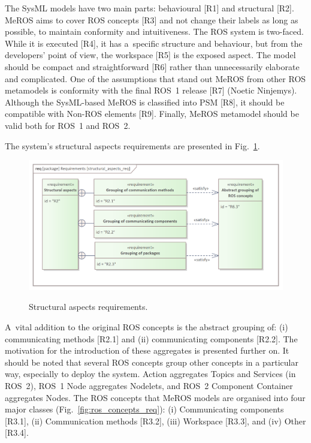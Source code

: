 The SysML models have two main parts: behavioural [R1] and structural [R2]. MeROS aims to cover ROS concepts [R3] and not change their labels as long as possible, to maintain conformity and intuitiveness. The ROS system is two-faced. While it is executed [R4], it has a~specific structure and behaviour, but from the developers' point of view, the workspace [R5] is the exposed aspect. The model should be compact and straightforward [R6] rather than unnecessarily elaborate and complicated. One of the assumptions that stand out MeROS from other ROS metamodels is conformity with the final ROS~1 release [R7] (Noetic Ninjemys). Although the SysML-based MeROS is classified into PSM [R8], it should be compatible with Non-ROS elements [R9]. Finally, MeROS metamodel should be valid both for ROS~1 and ROS~2.

The system's structural aspects requirements are presented in Fig.~\ref{fig:structural_aspects_req}.

\begin{figure}[H]
	\centering
	\begin{center}
	{\includegraphics[scale=0.9]{../imgs/requirement_pkg/structural_aspects_req.png}}
	\end{center}
	\caption{Structural aspects requirements.}
	\label{fig:structural_aspects_req}
\end{figure}

A~vital addition to the original ROS concepts is the abstract grouping of: (i) communicating methods [R2.1] and (ii) communicating components [R2.2]. The motivation for the introduction of these aggregates is presented further on. It should be noted that several ROS concepts group other concepts in a particular way, especially to deploy the system. Action aggregates Topics and Services (in ROS~2), ROS~1 Node aggregates Nodelets, and ROS~2 Component Container aggregates Nodes.
The ROS concepts that MeROS models are organised into four major classes (Fig.~\ref{fig:ros_concepts_req}): (i) Communicating components [R3.1], (ii) Communication methods [R3.2], (iii) Workspace [R3.3], and (iv) Other [R3.4].



